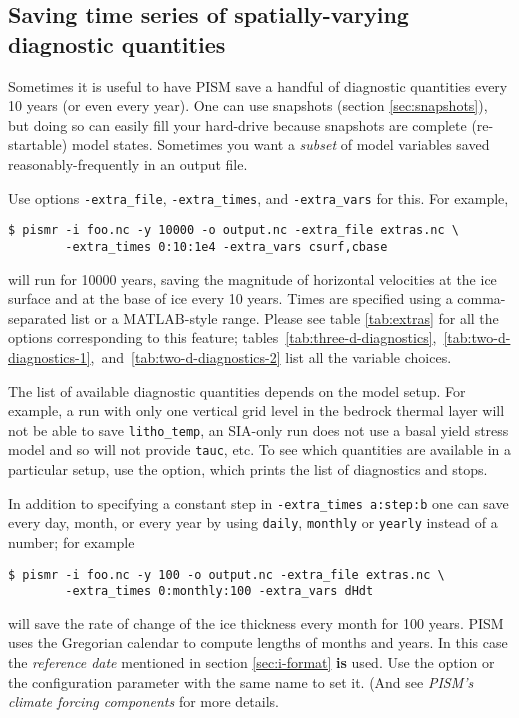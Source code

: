\subsection{Saving time series of spatially-varying diagnostic quantities}
\label{sec:saving-spat-vari}

Sometimes it is useful to have PISM save a handful of diagnostic quantities every 10 years (or even every year).  One can use snapshots (section \ref{sec:snapshots}), but doing so can easily fill your hard-drive because snapshots are complete (re-startable) model states.  Sometimes you want a \emph{subset} of model variables saved reasonably-frequently in an output file.

Use options \texttt{-extra_file}, \texttt{-extra_times}, and \texttt{-extra_vars} for this.  For example,
\begin{verbatim}
$ pismr -i foo.nc -y 10000 -o output.nc -extra_file extras.nc \
        -extra_times 0:10:1e4 -extra_vars csurf,cbase
\end{verbatim} %
will run for 10000 years, saving the magnitude of horizontal velocities at the
ice surface and at the base of ice every 10 years. Times are specified using a
comma-separated list or a MATLAB-style range. Please see table \ref{tab:extras}
for all the options corresponding to this feature;
tables~\ref{tab:three-d-diagnostics},~\ref{tab:two-d-diagnostics-1},~and~\ref{tab:two-d-diagnostics-2}
list all the variable choices.

The list of available diagnostic quantities depends on the model setup. For
example, a run with only one vertical grid level in the bedrock thermal layer
will not be able to save \texttt{litho_temp}, an SIA-only run does not use a
basal yield stress model and so will not provide \texttt{tauc}, etc. To see
which quantities are available in a particular setup, use the
 option, which prints the list of diagnostics
and stops.

In addition to specifying a constant step in \texttt{-extra_times a:step:b} one can save every day, month, or every year by using \texttt{daily}, \texttt{monthly} or \texttt{yearly} instead of a number; for example
\begin{verbatim}
$ pismr -i foo.nc -y 100 -o output.nc -extra_file extras.nc \
        -extra_times 0:monthly:100 -extra_vars dHdt
\end{verbatim} %
will save the rate of change of the ice thickness every month for 100 years.
PISM uses the Gregorian calendar to compute lengths of months and years. In
this case the \emph{reference date} mentioned in section \ref{sec:i-format}
\textbf{is} used. Use the \intextoption{reference_date} option or the
configuration parameter with the same name to set it. (And see \emph{PISM's
  climate forcing components} for more details.

